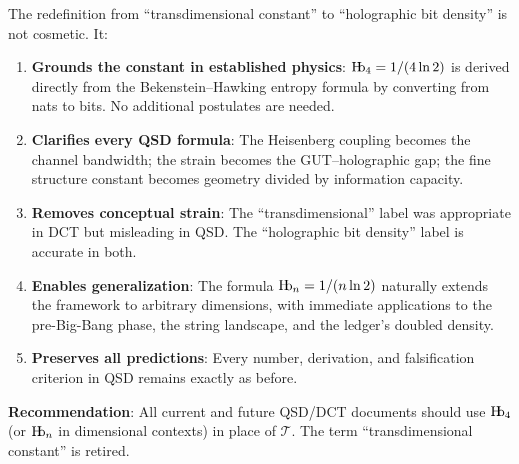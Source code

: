 \documentclass[11pt,a4paper]{article}
\theoremstyle{plain}
\theoremstyle{definition}
\newcommand{\Hb}{\textnormal{H\kern-0.3em b}}
\newcommand{\Hbn}{\Hb_n}
\newcommand{\Hbfour}{\Hb_4}
\newcommand{\Tc}{\mathcal{T}}
\begin{document}
The redefinition from ``transdimensional constant'' to ``holographic bit density'' is not cosmetic. It:

\begin{enumerate}
    \item \textbf{Grounds the constant in established physics}: $\Hbfour = 1/(4\ln 2)$ is derived directly from the Bekenstein--Hawking entropy formula by converting from nats to bits. No additional postulates are needed.
    
    \item \textbf{Clarifies every QSD formula}: The Heisenberg coupling becomes the channel bandwidth; the strain becomes the GUT--holographic gap; the fine structure constant becomes geometry divided by information capacity.
    
    \item \textbf{Removes conceptual strain}: The ``transdimensional'' label was appropriate in DCT but misleading in QSD. The ``holographic bit density'' label is accurate in both.
    
    \item \textbf{Enables generalization}: The formula $\Hbn = 1/(n\ln 2)$ naturally extends the framework to arbitrary dimensions, with immediate applications to the pre-Big-Bang phase, the string landscape, and the ledger's doubled density.
    
    \item \textbf{Preserves all predictions}: Every number, derivation, and falsification criterion in QSD remains exactly as before.
\end{enumerate}

\vspace{1em}
\noindent\textbf{Recommendation}: All current and future QSD/DCT documents should use $\Hbfour$ (or $\Hbn$ in dimensional contexts) in place of $\Tc$. The term ``transdimensional constant'' is retired.




\end{document}
